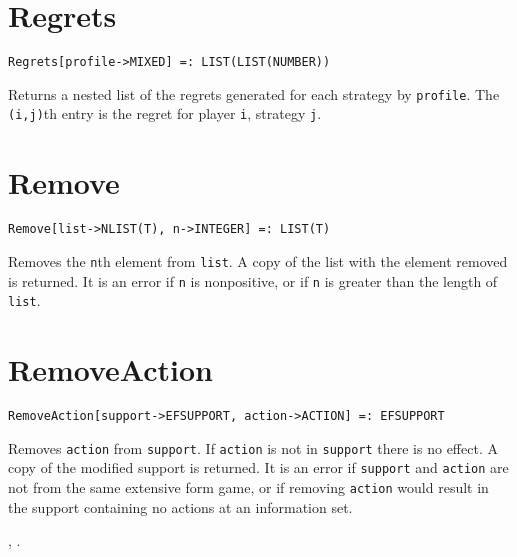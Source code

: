 
\section*{Regrets}\label{PrimRegrets}
\begin{verbatim}
Regrets[profile->MIXED] =: LIST(LIST(NUMBER)) 
\end{verbatim}

\noindent
Returns a nested list of the regrets generated for each strategy by
\verb+profile+.  The \verb+(i,j)+th entry is the regret for player
\verb+i+, strategy \verb+j+.


\section*{Remove}\label{PrimRemove}
\begin{verbatim}
Remove[list->NLIST(T), n->INTEGER] =: LIST(T) 
\end{verbatim}
\foralltypes

\noindent
Removes the \verb+n+th element from \verb+list+.  A copy of the list
with the element removed is returned.  It is an error if \verb+n+
is nonpositive, or if \verb+n+ is greater than the length of \verb+list+.



\section*{RemoveAction}\label{PrimRemoveAction}
\begin{verbatim}
RemoveAction[support->EFSUPPORT, action->ACTION] =: EFSUPPORT 
\end{verbatim}

\noindent
Removes \verb+action+ from \verb+support+.  If
\verb+action+ is not in \verb+support+ there is no
effect.  A copy of the modified support is returned.  It is an error
if \verb+support+ and \verb+action+ are not from the same extensive
form game, or if removing \verb+action+ would result in the support
containing no actions at an information set.

\seealso {},
.

\newsignature

